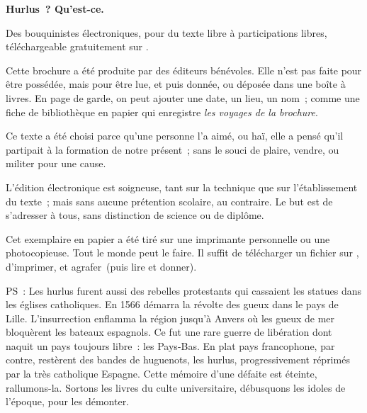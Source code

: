 \documentclass[twoside]{book} %
\begin{document}
  \hbox{}\newpage
  \ifodd\value{page}\hbox{}\newpage\fi
  {\centering\color{rubric}\bfseries\noindent\large
    Hurlus ? Qu’est-ce.\par
    \bigskip
  }
  \noindent Des bouquinistes électroniques, pour du texte libre à participations libres,
  téléchargeable gratuitement sur \href{https://hurlus.fr}{}.\par
  \bigskip
  \noindent Cette brochure a été produite par des éditeurs bénévoles.
  Elle n’est pas faite pour être possédée, mais pour être lue, et puis donnée, ou déposée dans une boîte à livres.
  En page de garde, on peut ajouter une date, un lieu, un nom ;
  comme une fiche de bibliothèque en papier qui enregistre \emph{les voyages de la brochure}.
  \par

  Ce texte a été choisi parce qu’une personne l’a aimé,
  ou haï, elle a pensé qu’il partipait à la formation de notre présent ;
  sans le souci de plaire, vendre, ou militer pour une cause.
  \par

  L’édition électronique est soigneuse, tant sur la technique
  que sur l’établissement du texte ; mais sans aucune prétention scolaire, au contraire.
  Le but est de s’adresser à tous, sans distinction de science ou de diplôme.
  \par

  Cet exemplaire en papier a été tiré sur une imprimante personnelle
   ou une photocopieuse. Tout le monde peut le faire.
  Il suffit de
  télécharger un fichier sur \href{https://hurlus.fr}{},
  d’imprimer, et agrafer (puis lire et donner).\par

  \bigskip

  \noindent PS : Les hurlus furent aussi des rebelles protestants qui cassaient les statues dans les églises catholiques. En 1566 démarra la révolte des gueux dans le pays de Lille. L’insurrection enflamma la région jusqu’à Anvers où les gueux de mer bloquèrent les bateaux espagnols.
  Ce fut une rare guerre de libération dont naquit un pays toujours libre : les Pays-Bas.
  En plat pays francophone, par contre, restèrent des bandes de huguenots, les hurlus, progressivement réprimés par la très catholique Espagne.
  Cette mémoire d’une défaite est éteinte, rallumons-la. Sortons les livres du culte universitaire, débusquons les idoles de l’époque, pour les démonter.
\fi
\end{document}
